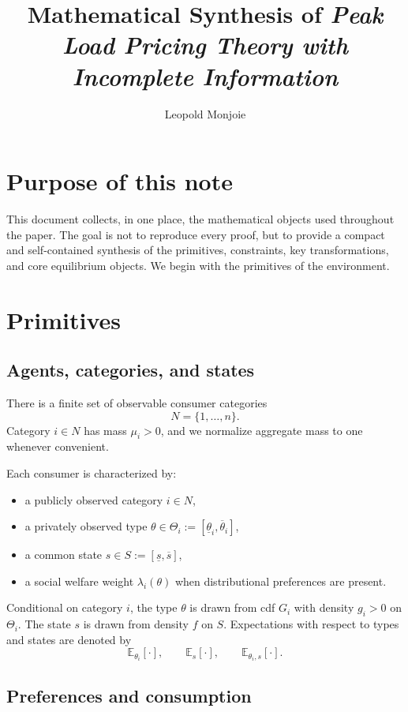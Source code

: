 \documentclass[master.tex]{subfiles}
\title{Mathematical Synthesis of \emph{Peak Load Pricing Theory with Incomplete Information}}
\author{Leopold Monjoie}
\date{}
\begin{document}
\maketitle

\section{Purpose of this note}

This document collects, in one place, the mathematical objects used throughout the paper. The goal is not to reproduce every proof, but to provide a compact and self-contained synthesis of the primitives, constraints, key transformations, and core equilibrium objects. We begin with the primitives of the environment.

\section{Primitives}

\subsection{Agents, categories, and states}

There is a finite set of observable consumer categories
\[
N = \{1,\dots,n\}.
\]
Category $i \in N$ has mass $\mu_i>0$, and we normalize aggregate mass to one whenever convenient.

Each consumer is characterized by:
\begin{itemize}[leftmargin=2em]
    \item a publicly observed category $i \in N$,
    \item a privately observed type $\theta \in \Theta_i := [\underline \theta_i,\overline \theta_i]$,
    \item a common state $s \in S := [\underline s,\overline s]$,
    \item a social welfare weight $\lambda_i(\theta)$ when distributional preferences are present.
\end{itemize}

Conditional on category $i$, the type $\theta$ is drawn from cdf $G_i$ with density $g_i>0$ on $\Theta_i$. The state $s$ is drawn from density $f$ on $S$. Expectations with respect to types and states are denoted by
\[
\mathbb E_{\theta_i}[\cdot], \qquad \mathbb E_s[\cdot], \qquad \mathbb E_{\theta_i,s}[\cdot].
\]

\subsection{Preferences and consumption}
\end{document}
